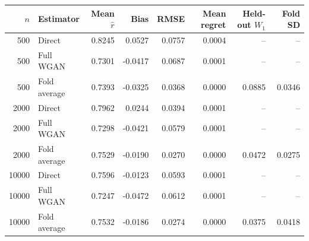\begin{tabular}{rlrrrrrr}
\toprule
$n$ & Estimator & Mean $\widehat r$ & Bias & RMSE & Mean regret & Held-out $W_1$ & Fold SD \\
\midrule
500 & Direct & 0.8245 & 0.0527 & 0.0757 & 0.0004 & -- & -- \\
500 & Full WGAN & 0.7301 & -0.0417 & 0.0687 & 0.0001 & -- & -- \\
500 & Fold average & 0.7393 & -0.0325 & 0.0368 & 0.0000 & 0.0885 & 0.0346 \\
2000 & Direct & 0.7962 & 0.0244 & 0.0394 & 0.0001 & -- & -- \\
2000 & Full WGAN & 0.7298 & -0.0421 & 0.0579 & 0.0001 & -- & -- \\
2000 & Fold average & 0.7529 & -0.0190 & 0.0270 & 0.0000 & 0.0472 & 0.0275 \\
10000 & Direct & 0.7596 & -0.0123 & 0.0593 & 0.0001 & -- & -- \\
10000 & Full WGAN & 0.7247 & -0.0472 & 0.0612 & 0.0001 & -- & -- \\
10000 & Fold average & 0.7532 & -0.0186 & 0.0274 & 0.0000 & 0.0375 & 0.0418 \\
\bottomrule
\end{tabular}
